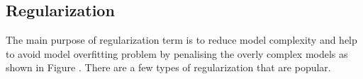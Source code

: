 \subsection{Regularization}

The main purpose of regularization term is to reduce model complexity and help to avoid model overfitting problem by penalising the overly complex models as shown in Figure . There are a few types of regularization that are popular. 